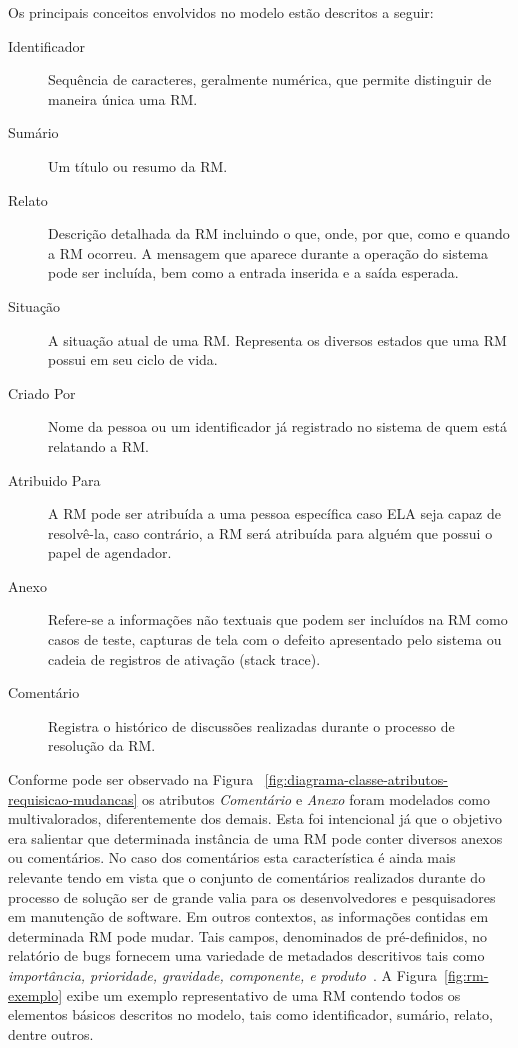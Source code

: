 Os principais conceitos envolvidos no modelo estão descritos a seguir:

\begin{description}
	\item [Identificador] Sequência de caracteres,  geralmente numérica,  que
		permite distinguir de maneira única uma RM.
	\item [Sumário] Um título ou resumo da RM.
	\item [Relato] Descrição detalhada da RM incluindo o que, onde, por que,
		como e quando a RM ocorreu. A mensagem que aparece durante a operação do
		sistema pode ser incluída, bem como a entrada inserida e a saída
		esperada.
	\item [Situação] A situação atual de uma RM\@. Representa os diversos estados
		que uma RM possui em seu ciclo de vida.
	\item [Criado Por] Nome da pessoa ou um identificador  já registrado no
		sistema de quem está relatando a RM\@.
	\item [Atribuido Para] A RM pode ser atribuída a uma pessoa específica caso
		ELA seja capaz de resolvê-la, caso contrário, a RM será atribuída para
		alguém que possui o papel de agendador.
	\item [Anexo] Refere-se a informações não textuais que podem ser incluídos
		na RM como casos de teste, capturas de tela com o defeito apresentado
		pelo sistema ou cadeia de registros de ativação (stack trace).
	\item [Comentário] Registra o histórico de discussões realizadas durante o
		processo de resolução da RM\@.
\end{description}

Conforme pode ser observado na Figura
~\ref{fig:diagrama-classe-atributos-requisicao-mudancas} os atributos
\textit{Comentário} e \textit{Anexo} foram modelados como multivalorados,
diferentemente dos demais. Esta foi intencional já que o objetivo era salientar
que determinada instância de uma RM pode conter diversos anexos ou comentários.
No caso dos comentários esta característica é ainda mais relevante tendo em
vista que o conjunto de comentários realizados durante do processo de solução
ser de grande valia para os desenvolvedores e pesquisadores em manutenção de
software. Em outros contextos, as informações contidas em determinada RM pode
mudar. Tais campos, denominados de pré-definidos, no relatório de bugs fornecem
uma variedade de metadados descritivos tais como \textit{importância,
	prioridade, gravidade, componente, e produto}~\cite{zhang2016literature}. A
Figura~\ref{fig:rm-exemplo} exibe um exemplo representativo de uma RM contendo
todos os elementos básicos descritos no modelo, tais como identificador,
sumário, relato, dentre outros.

